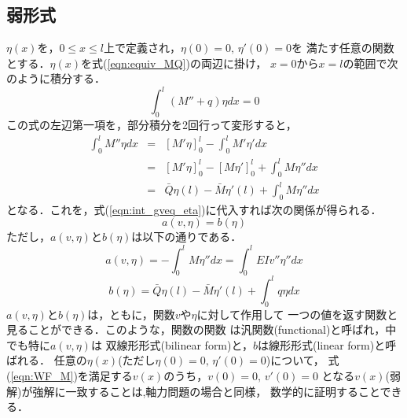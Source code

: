 \documentclass[10pt,a4j]{jarticle}
\begin{document}
\subsection{弱形式}
$\eta (x)$を，$0\leq x \leq l$上で定義され，$\eta(0)=0,\, \eta'(0)=0$を
満たす任意の関数とする．$\eta (x)$を式(\ref{eqn:equiv_MQ})の両辺に掛け，
$x=0$から$x=l$の範囲で次のように積分する．
\begin{equation}
	\int _0^l 
	\left(M''+q \right) \eta dx =0
	\label{eqn:int_gveq_eta}
\end{equation}
この式の左辺第一項を，部分積分を2回行って変形すると，
\begin{eqnarray}
	\int _0^l M''\eta dx &= & \left[ M'\eta \right]_0^l -\int_0^l M' \eta'dx  
	\label{eqn:}
	\\
	&= & \left[ M'\eta \right]_0^l -\left[M\eta'\right]_0^l+\int_0^l M \eta''dx  
	\label{eqn:}
	\\
	&= & \bar Q \eta(l) - \bar M \eta'(l)+\int_0^l M \eta''dx  
\end{eqnarray}
となる．これを，式(\ref{eqn:int_gveq_eta})に代入すれば次の関係が得られる．
\begin{equation}
	a(v,\eta)=b(\eta)
	\label{eqn:WF_M}
\end{equation}
ただし，$a(v,\eta)$と$b(\eta)$は以下の通りである．
\begin{equation}
	a(v,\eta) = -\int_0^l M \eta''dx  
	= \int_0^l EI v'' \eta''dx  
	\label{eqn:blinf_M}
\end{equation}
\begin{equation}
	b(\eta)= 
	\bar Q \eta (l) - 
	\bar M \eta' (l) + 
	\int_0^l q\eta dx 
	\label{eqn:linf_M}
\end{equation}
$a(v,\eta)$と$b(\eta)$は，ともに，関数$v$や$\eta$に対して作用して
一つの値を返す関数と見ることができる．このような，関数の関数
は汎関数(functional)と呼ばれ，中でも特に$a(v,\eta)$は
双線形形式(bilinear form)と，$b$は線形形式(linear form)と呼ばれる．
任意の$\eta(x)$(ただし$\eta(0)=0,\, \eta'(0)=0$)について，
式(\ref{eqn:WF_M})を満足する$v(x)$のうち，$v(0)=0,\, v'(0)=0$
となる$v(x)$(弱解)が強解に一致することは,軸力問題の場合と同様，
数学的に証明することできる．
\end{document}
